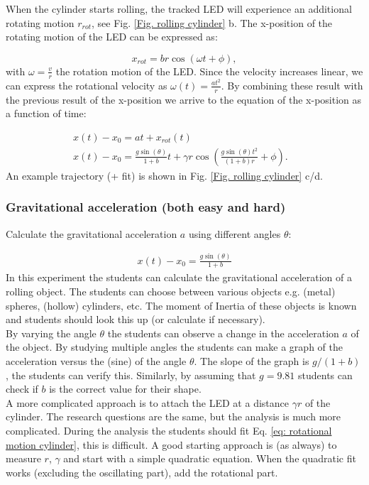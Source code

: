 \documentclass{article}
\begin{document}
When the cylinder starts rolling, the tracked LED will experience an additional rotating motion $r_{rot}$, see Fig. \ref{Fig. rolling cylinder} b. The x-position of the rotating motion of the LED can be expressed as:

\begin{equation}
    x_{rot} = br\cos(\omega t + \phi),
\end{equation}
with $\omega = \frac{v}{r}$ the rotation motion of the LED. Since the velocity increases linear, we can express the rotational velocity as $\omega(t) = \frac{a t^2}{r}$. By combining these result with the previous result of the x-position we arrive to the equation of the x-position as a function of time:

\begin{align}
    x(t) - x_0 = at +x_{rot}(t) & \\
    x(t) - x_0 =  \frac{g\sin(\theta)}{1+b}t + \gamma r\cos(\frac{
        g\sin(\theta)t^2}{(1+b)r} +\phi).
    \label{eq: rotational motion cylinder}
\end{align}
An example trajectory (+ fit) is shown in Fig. \ref{Fig. rolling cylinder} c/d.

\subsubsection{Gravitational acceleration (both easy and hard)}    
Calculate the gravitational acceleration $a$ using different angles $\theta$:

\begin{align}
    x(t) - x_0 =  \frac{g\sin(\theta)}{1+b}
\end{align}
In this experiment the students can calculate the gravitational acceleration of a rolling object. The students can choose between various objects e.g. (metal) spheres, (hollow) cylinders, etc. The moment of Inertia of these objects is known and students should look this up (or calculate if necessary). \\

By varying the angle $\theta$ the students can observe a change in the acceleration $a$ of the object. By studying multiple angles the students can make a graph of the acceleration versus the (sine) of the angle $\theta$. The slope of the graph is $g/(1+b)$, the students can verify this. Similarly, by assuming that $g = 9.81$ students can check if $b$ is the correct value for their shape. \\

A more complicated approach is to attach the LED at a distance $\gamma r$ of the cylinder. The research questions are the same, but the analysis is much more complicated. During the analysis the students should fit Eq. \ref{eq: rotational motion cylinder}, this is difficult. A good starting approach is (as always) to measure $r$, $\gamma$ and start with a simple quadratic equation. When the quadratic fit works (excluding the oscillating part), add the rotational part.
\end{document}
